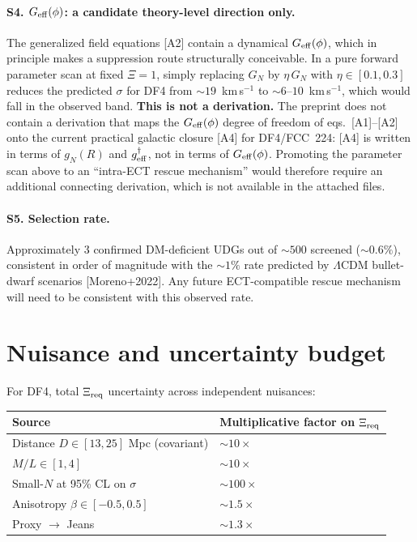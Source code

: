 \documentclass[11pt]{article}
\begin{document}
\paragraph{S4. $G_{\rm eff}(\phi)$: a candidate theory-level direction only.}
The generalized field equations [A2] contain a dynamical $G_{\rm eff}(\phi)$,
which in principle makes a suppression route structurally conceivable.
In a pure forward parameter scan at fixed $\Xi=1$, simply replacing
$G_N$ by $\eta\,G_N$ with $\eta\in[0.1,0.3]$ reduces the predicted
$\sigma$ for DF4 from $\sim 19$~km\,s$^{-1}$ to $\sim 6$--$10$~km\,s$^{-1}$,
which would fall in the observed band.
\textbf{This is not a derivation.} The preprint does not contain a
derivation that maps the $G_{\rm eff}(\phi)$ degree of freedom of
eqs.~[A1]--[A2] onto the current practical galactic closure [A4] for
DF4/FCC~224: [A4] is written in terms of $g_N(R)$ and
$g^\dagger_{\rm eff}$, not in terms of $G_{\rm eff}(\phi)$. Promoting
the parameter scan above to an ``intra-ECT rescue mechanism'' would
therefore require an additional connecting derivation, which is not
available in the attached files.

\paragraph{S5. Selection rate.}
Approximately 3 confirmed DM-deficient UDGs out of $\sim 500$ screened
($\sim 0.6\%$), consistent in order of magnitude with the $\sim 1\%$
rate predicted by $\Lambda$CDM bullet-dwarf scenarios [Moreno+2022].
Any future ECT-compatible rescue mechanism will need to be consistent
with this observed rate.

\section{Nuisance and uncertainty budget}
\label{sec:nuisance}

For DF4, total $\Xi_{\rm req}$ uncertainty across independent nuisances:

\begin{center}
\begin{tabular}{ll}
\toprule
Source & Multiplicative factor on $\Xi_{\rm req}$\\
\midrule
Distance $D\in[13,25]$ Mpc (covariant) & $\sim 10\times$\\
$M/L\in[1,4]$ & $\sim 10\times$\\
Small-$N$ at 95\% CL on $\sigma$ & $\sim 100\times$\\
Anisotropy $\beta\in[-0.5,0.5]$ & $\sim 1.5\times$\\
Proxy $\to$ Jeans & $\sim 1.3\times$\\
\bottomrule
\end{tabular}
\end{center}
\end{document}
